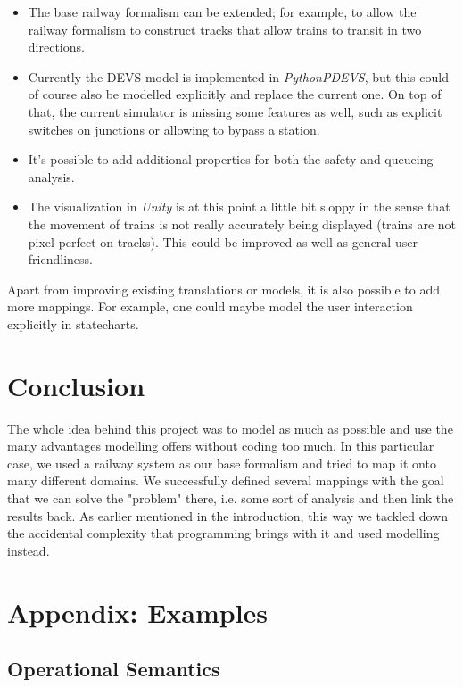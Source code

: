 \documentclass{article}
\begin{document}
\begin{itemize}
    \item The base railway formalism can be extended; for example, to allow the railway formalism to construct tracks that allow trains to transit in two directions.
    \item Currently the DEVS model is implemented in \textit{PythonPDEVS}, but this could of course also be modelled explicitly and replace the current one. On top of that, the current simulator is missing some features as well, such as explicit switches on junctions or allowing to bypass a station.
    \item It's possible to add additional properties for both the safety and queueing analysis.
    \item The visualization in \textit{Unity} is at this point a little bit sloppy in the sense that the movement of trains is not really accurately being displayed (trains are not pixel-perfect on tracks). This could be improved as well as general user-friendliness.
\end{itemize}

Apart from improving existing translations or models, it is also possible to add more mappings. For example, one could maybe model the user interaction explicitly in statecharts.

\section{Conclusion}

The whole idea behind this project was to model as much as possible and use the many advantages modelling offers without coding too much. In this particular case, we used a railway system as our base formalism and tried to map it onto many different domains. We successfully defined several mappings with the goal that we can solve the "problem" there, i.e. some sort of analysis and then link the results back. As earlier mentioned in the introduction, this way we tackled down the accidental complexity that programming brings with it and used modelling instead.


\nocite{*}


\newpage
\section*{Appendix: Examples}
\label{appendix}

\subsection*{Operational Semantics}
\end{document}
